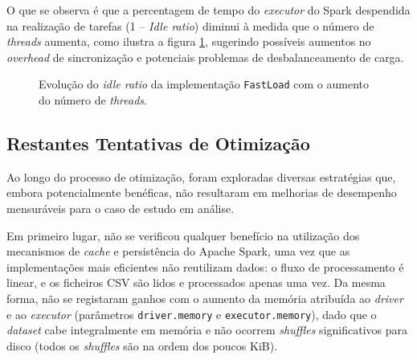 \documentclass[11pt, a4paper]{article}
\begin{document}
O que se observa é que a percentagem de tempo do \emph{executor} do Spark despendida na realização
de tarefas (1 -- \emph{Idle ratio}) diminui à medida que o número de \emph{threads} aumenta, como
ilustra a figura \ref{idle-ratio}, sugerindo possíveis aumentos no \emph{overhead} de sincronização
e potenciais problemas de desbalanceamento de carga.

\begin{figure}[H]
    \centering

    \caption{
        Evolução do \emph{idle ratio} da implementação \texttt{FastLoad} com o aumento do número de
        \emph{threads}.
    }
    \label{idle-ratio}
\end{figure}

\subsection{Restantes Tentativas de Otimização}

Ao longo do processo de otimização, foram exploradas diversas estratégias que, embora potencialmente
benéficas, não resultaram em melhorias de desempenho mensuráveis para o caso de estudo em análise.

Em primeiro lugar, não se verificou qualquer benefício na utilização dos mecanismos de \emph{cache}
e persistência do Apache Spark, uma vez que as implementações mais eficientes não reutilizam dados:
o fluxo de processamento é linear, e os ficheiros CSV são lidos e processados apenas uma vez. Da
mesma forma, não se registaram ganhos com o aumento da memória atribuída ao \emph{driver} e ao
\emph{executor} (parâmetros \texttt{driver.memory} e \texttt{executor.memory}), dado que o
\emph{dataset} cabe integralmente em memória e não ocorrem \emph{shuffles} significativos para
disco (todos os \emph{shuffles} são na ordem dos poucos KiB).
\end{document}
